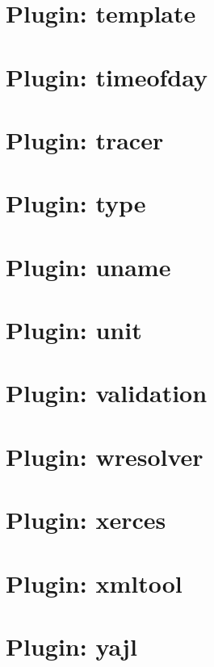\let\mypdfximage\pdfximage\def\pdfximage{\immediate\mypdfximage}\documentclass[twoside]{book}
\newcommand{\+}{\discretionary{\mbox{\scriptsize$\hookleftarrow$}}{}{}}
\begin{document}
\chapter{Plugin\+: template}
\label{autotoc_md684}

\chapter{Plugin\+: timeofday}
\label{autotoc_md689}

\chapter{Plugin\+: tracer}
\label{autotoc_md692}

\chapter{Plugin\+: type}
\label{autotoc_md695}

\chapter{Plugin\+: uname}
\label{autotoc_md702}

\chapter{Plugin\+: unit}
\label{autotoc_md706}

\chapter{Plugin\+: validation}
\label{autotoc_md710}

\chapter{Plugin\+: wresolver}
\label{autotoc_md715}

\chapter{Plugin\+: xerces}
\label{autotoc_md716}

\chapter{Plugin\+: xmltool}
\label{autotoc_md722}

\chapter{Plugin\+: yajl}
\label{autotoc_md726}

\end{document}
